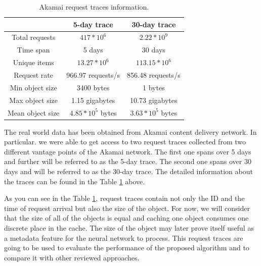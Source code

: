 \begin{table}[h!]
	\centering
	\begin{tabular}{| c | c | c |}
		\hline
		& 5-day trace & 30-day trace \\
		\hline 
		Total requests & $ 417 * 10^6 $ & $ 2.22 * 10^9 $ \\ 
		Time span & 5 days & 30 days \\
		Unique items & $ 13.27 * 10^6 $ & $ 113.15 * 10^6 $ \\
		Request rate & 966.97 requests/s & 856.48 requests/s \\
		Min object size & 3400 bytes & 1 bytes \\
		Max object size & 1.15 gigabytes & 10.73 gigabytes \\ 
		Mean object size & $ 4.85 * 10^5 $ bytes & $ 3.63 * 10^5 $ bytes \\
		\hline
	\end{tabular}
	\caption{Akamai request traces information.}
	\label{table:1}
\end{table}

The real world data has been obtained from Akamai content delivery network\cite{12}. In particular. we were able to get access to two request traces collected from two different vantage points of the Akamai network. The first one spans over 5 days and further will be referred to as the 5-day trace. The second one spans over 30 days and will be referred to as the 30-day trace. The detailed information about the traces can be found in the Table \ref{table:1} above.

As you can see in the Table \ref{table:1}, request traces contain not only the ID and the time of request arrival but also the size of the object. For now, we will consider that the size of all of the objects is equal and caching one object consumes one discrete place in the cache. The size of the object may later prove itself useful as a metadata feature for the neural network to process. This request traces are going to be used to evaluate the performance of the proposed algorithm and to compare it with other reviewed approaches.

